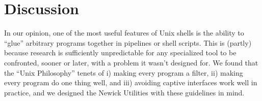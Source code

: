 \documentclass[a4paper,11pt]{article}
\begin{document}
\section*{Discussion}

In our opinion, one of the most useful features of Unix shells is the ability to  ``glue'' arbitrary programs together in pipelines or shell scripts. This is (partly) because research is sufficiently unpredictable for any specialized tool to be confronted, sooner or later, with a problem it wasn't designed for. We found that the ``Unix Philosophy'' tenets of i) making every program a filter, ii) making every program do one thing well, and iii) avoiding captive interfaces work well in practice, and we designed the Newick Utilities with these guidelines in mind.

 

\end{document}

